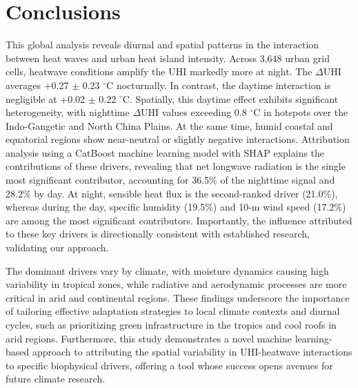 \section*{Conclusions}
This global analysis reveals diurnal and spatial patterns in the interaction between heat waves and urban heat island intensity. Across 3,648 urban grid cells, heatwave conditions amplify the UHI markedly more at night. The \ensuremath{\Delta }UHI averages +0.27 \ensuremath{\pm} 0.23 \ensuremath{^\circ}C nocturnally. In contrast, the daytime interaction is negligible at +0.02 \ensuremath{\pm} 0.22 \ensuremath{^\circ}C. Spatially, this daytime effect exhibits significant heterogeneity, with nighttime \ensuremath{\Delta }UHI values exceeding 0.8 \ensuremath{^\circ}C in hotspots over the Indo-Gangetic and North China Plains. At the same time, humid coastal and equatorial regions show near-neutral or slightly negative interactions. Attribution analysis using a CatBoost machine learning model with SHAP explains the contributions of these drivers, revealing that net longwave radiation is the single most significant contributor, accounting for 36.5\% of the nighttime signal and 28.2\% by day. At night, sensible heat flux is the second-ranked driver (21.0\%), whereas during the day, specific humidity (19.5\%) and 10-m wind speed (17.2\%) are among the most significant contributors. Importantly, the influence attributed to these key drivers is directionally consistent with established research, validating our approach.

The dominant drivers vary by climate, with moisture dynamics causing high variability in tropical zones, while radiative and aerodynamic processes are more critical in arid and continental regions. These findings underscore the importance of tailoring effective adaptation strategies to local climate contexts and diurnal cycles, such as prioritizing green infrastructure in the tropics and cool roofs in arid regions. Furthermore, this study demonstrates a novel machine learning-based approach to attributing the spatial variability in UHI-heatwave interactions to specific biophysical drivers, offering a tool whose success opens avenues for future climate research. 